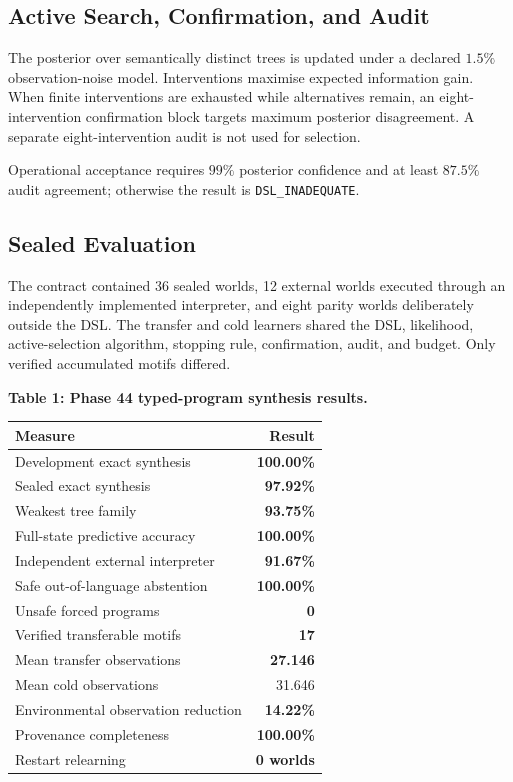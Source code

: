 \subsection{Active Search, Confirmation, and Audit}

The posterior over semantically distinct trees is updated under a declared
$1.5\%$ observation-noise model. Interventions maximise expected information
gain. When finite interventions are exhausted while alternatives remain,
an eight-intervention confirmation block targets maximum posterior
disagreement. A separate eight-intervention audit is not used for selection.

Operational acceptance requires $99\%$ posterior confidence and at least
$87.5\%$ audit agreement; otherwise the result is
\texttt{DSL\_INADEQUATE}.

\subsection{Sealed Evaluation}

The contract contained 36 sealed worlds, 12 external worlds executed through
an independently implemented interpreter, and eight parity worlds deliberately
outside the DSL. The transfer and cold learners shared the DSL, likelihood,
active-selection algorithm, stopping rule, confirmation, audit, and budget.
Only verified accumulated motifs differed.

\begin{center}
  \begin{minipage}{0.78\textwidth}
  \centering
  \textbf{Table 1: Phase 44 typed-program synthesis results.}\\[0.35em]
  \begin{tabular}{lr}
    \hline
    Measure & Result \\
    \hline
    Development exact synthesis & \textbf{100.00\%} \\
    Sealed exact synthesis & \textbf{97.92\%} \\
    Weakest tree family & \textbf{93.75\%} \\
    Full-state predictive accuracy & \textbf{100.00\%} \\
    Independent external interpreter & \textbf{91.67\%} \\
    Safe out-of-language abstention & \textbf{100.00\%} \\
    Unsafe forced programs & \textbf{0} \\
    Verified transferable motifs & \textbf{17} \\
    Mean transfer observations & \textbf{27.146} \\
    Mean cold observations & 31.646 \\
    Environmental observation reduction & \textbf{14.22\%} \\
    Provenance completeness & \textbf{100.00\%} \\
    Restart relearning & \textbf{0 worlds} \\
    \hline
  \end{tabular}
  \end{minipage}
\end{center}


